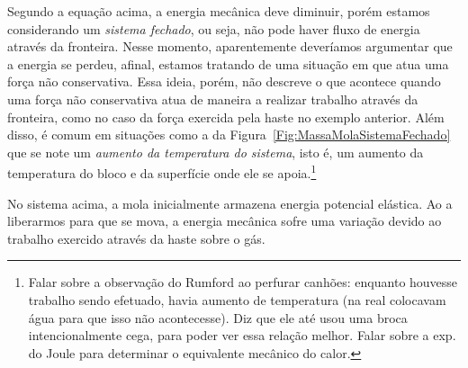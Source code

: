 Segundo a equação acima, a energia mecânica deve diminuir, porém estamos considerando um \emph{sistema fechado}, ou seja, não pode haver fluxo de energia através da fronteira. Nesse momento, aparentemente deveríamos argumentar que a energia se perdeu, afinal, estamos tratando de uma situação em que atua uma força não conservativa. Essa ideia, porém, não descreve o que acontece quando uma força não conservativa atua de maneira a realizar trabalho através da fronteira, como no caso da força exercida pela haste no exemplo anterior. Além disso, é comum em situações como a da Figura~\ref{Fig:MassaMolaSistemaFechado} que se note um \emph{aumento da temperatura do sistema}, isto é, um aumento da temperatura do bloco e da superfície onde ele se apoia.\footnote{\textrm{Falar sobre a observação do Rumford ao perfurar canhões: enquanto houvesse trabalho sendo efetuado, havia aumento de temperatura (na real colocavam água para que isso não acontecesse). Diz que ele até usou uma broca intencionalmente cega, para poder ver essa relação melhor. Falar sobre a exp. do Joule para determinar o equivalente mecânico do calor.}}

\begin{marginfigure}
\centering
{}
\caption{No sistema acima, a mola inicialmente armazena energia potencial elástica. Ao a liberarmos para que se mova, a energia mecânica sofre uma variação devido ao trabalho exercido através da haste sobre o gás.\label{Fig:PistaoEMola}}
\end{marginfigure}

